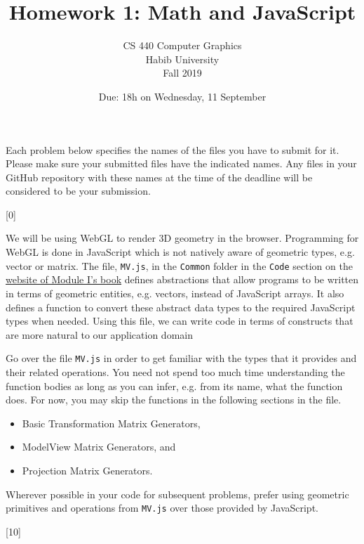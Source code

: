 \documentclass[addpoints]{exam}
\title{Homework 1: Math and JavaScript}
\author{CS 440 Computer Graphics\\Habib University\\Fall 2019}
\date{Due: 18h on Wednesday, 11 September}
\begin{document}
\maketitle

Each problem below specifies the names of the files you have to submit for it. Please make sure your submitted files have the indicated names. Any files in your GitHub repository with these names at the time of the deadline will be considered to be your submission.

\begin{questions}

  [0]

  We will be using WebGL to render 3D geometry in the browser. Programming for WebGL is done in JavaScript which is not natively aware of geometric types, e.g. vector or matrix. The file, \texttt{MV.js}, in the \texttt{Common} folder in the \texttt{Code} section on the \href{https://www.cs.unm.edu/~angel/BOOK/INTERACTIVE_COMPUTER_GRAPHICS/SEVENTH_EDITION/}{website of Module I's book} defines abstractions that allow programs to be written in terms of geometric entities, e.g. vectors, instead of JavaScript arrays. It also defines a function to convert these abstract data types to the required JavaScript types when needed. Using this file, we can write code in terms of constructs that are more natural to our application domain

  Go over the file {\tt MV.js} in order to get familiar with the types that it provides and their related operations. You need not spend too much time understanding the function bodies as long as you can infer, e.g. from its name, what the function does. For now, you may skip the functions in the following sections in the file.
  \begin{itemize}
  \item Basic Transformation Matrix Generators, 
  \item ModelView Matrix Generators, and
  \item Projection Matrix Generators.
  \end{itemize}

  Wherever possible in your code for subsequent problems, prefer using geometric primitives and operations from {\tt MV.js} over those provided by JavaScript.
  
  [10]


\end{questions}
\end{document}

